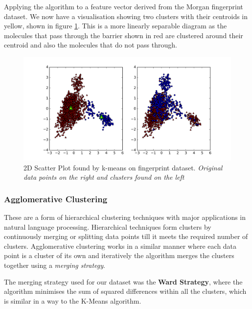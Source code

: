 \documentclass[a4paper,12pt]{report}
\begin{document}
			Applying the algorithm to a feature vector derived from the Morgan fingerprint dataset. We now have a visualisation showing two clusters with their centroids in yellow, shown in figure \ref{fig:kmeans_morgan_scatter}. This is a more linearly separable diagram as the molecules that pass through the barrier shown in red are clustered around their centroid and also the molecules that do not pass through.
			\begin{figure}[H]
				\centering
				\includegraphics[width=\textwidth,scale=1,totalheight=0.4\textheight]{images/kmeans_morgan_scatter}
				\caption{2D Scatter Plot found by k-means on fingerprint dataset. \textit{Original data points on the right and clusters found on the left}}
				\label{fig:kmeans_morgan_scatter}
			\end{figure}
			
			
			\subsubsection{Agglomerative Clustering}
			These are a form of hierarchical clustering techniques with major applications in natural language processing. Hierarchical techniques form clusters by continuously merging or splitting data points till it meets the required number of clusters. Agglomerative clustering works in a similar manner where each data point is a cluster of its own and iteratively the algorithm merges the clusters together using a \textit{merging strategy}. 
			
			The merging strategy used for our dataset was the \textbf{Ward Strategy}, where the algorithm minimises the sum of squared differences within all the clusters, which is similar in a way to the K-Means algorithm.
			
\end{document}
